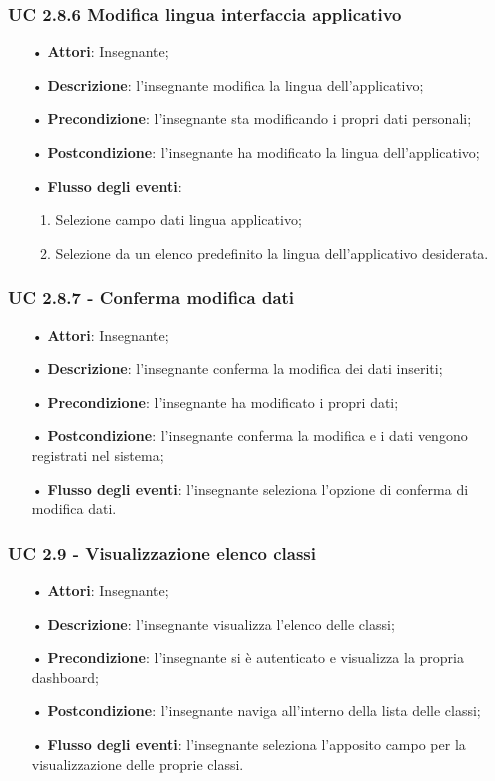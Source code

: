 \subsubsection{UC 2.8.6 Modifica lingua interfaccia applicativo}
\begin{itemize}
	\item[•]\textbf{Attori}: Insegnante;
	\item[•]\textbf{Descrizione}: l'insegnante modifica la lingua dell'applicativo;
	\item[•]\textbf{Precondizione}: l'insegnante sta modificando i propri dati personali;
	\item[•]\textbf{Postcondizione}: l'insegnante ha modificato la lingua dell'applicativo; 
	\item[•]\textbf{Flusso degli eventi}: 
	\begin{enumerate}
		\item Selezione campo dati lingua applicativo;
		\item Selezione da un elenco predefinito la lingua dell'applicativo desiderata.
	\end{enumerate}
\end{itemize}

\subsubsection{UC 2.8.7 - Conferma modifica dati}
\begin{itemize}
	\item[•]\textbf{Attori}: Insegnante;
	\item[•]\textbf{Descrizione}: l'insegnante conferma la modifica dei dati inseriti;
	\item[•]\textbf{Precondizione}: l'insegnante ha modificato i propri dati;
	\item[•]\textbf{Postcondizione}: l'insegnante conferma la modifica e i dati vengono registrati nel sistema; 
	\item[•]\textbf{Flusso degli eventi}: l'insegnante seleziona l'opzione di conferma di modifica dati.
\end{itemize}


\subsubsection{UC 2.9 - Visualizzazione elenco classi}
\begin{itemize}
	\item[•] \textbf{Attori}: Insegnante;
	\item[•] \textbf{Descrizione}: l'insegnante visualizza l'elenco delle classi;
	\item[•] \textbf{Precondizione}: l'insegnante si è autenticato e visualizza la propria dashboard;
	\item[•] \textbf{Postcondizione}: l'insegnante naviga all'interno della lista delle classi;
	\item[•] \textbf{Flusso degli eventi}: l'insegnante seleziona l'apposito campo per la visualizzazione delle proprie classi.
\end{itemize}

